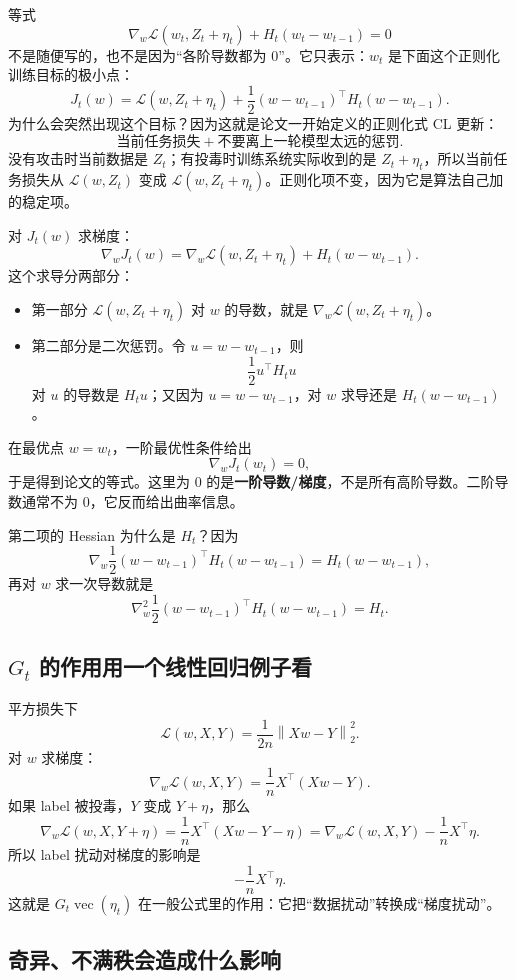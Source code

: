 \documentclass[UTF8,fontset=none,11pt]{ctexart}
\theoremstyle{cnstyle}
\newcommand{\vect}{\operatorname{vec}}
\newcommand{\calL}{\mathcal{L}}
\newcommand{\norm}[1]{\left\lVert #1\right\rVert}
\begin{document}
等式
\[
  \nabla_w\calL(w_t,Z_t+\eta_t)+H_t(w_t-w_{t-1})=0
\]
不是随便写的，也不是因为“各阶导数都为 0”。它只表示：\(w_t\) 是下面这个正则化训练目标的极小点：
\[
  J_t(w)
  =
  \calL(w,Z_t+\eta_t)
  +\frac12(w-w_{t-1})^\top H_t(w-w_{t-1}).
\]
为什么会突然出现这个目标？因为这就是论文一开始定义的正则化式 CL 更新：
\[
  \text{当前任务损失}+\text{不要离上一轮模型太远的惩罚}.
\]
没有攻击时当前数据是 \(Z_t\)；有投毒时训练系统实际收到的是 \(Z_t+\eta_t\)，所以当前任务损失从 \(\calL(w,Z_t)\) 变成 \(\calL(w,Z_t+\eta_t)\)。正则化项不变，因为它是算法自己加的稳定项。

对 \(J_t(w)\) 求梯度：
\[
  \nabla_wJ_t(w)
  =
  \nabla_w\calL(w,Z_t+\eta_t)
  +
  H_t(w-w_{t-1}).
\]
这个求导分两部分：
\begin{itemize}
  \item 第一部分 \(\calL(w,Z_t+\eta_t)\) 对 \(w\) 的导数，就是 \(\nabla_w\calL(w,Z_t+\eta_t)\)。
  \item 第二部分是二次惩罚。令 \(u=w-w_{t-1}\)，则
  \[
    \frac12u^\top H_tu
  \]
  对 \(u\) 的导数是 \(H_tu\)；又因为 \(u=w-w_{t-1}\)，对 \(w\) 求导还是 \(H_t(w-w_{t-1})\)。
\end{itemize}
在最优点 \(w=w_t\)，一阶最优性条件给出
\[
  \nabla_wJ_t(w_t)=0,
\]
于是得到论文的等式。这里为 0 的是\textbf{一阶导数/梯度}，不是所有高阶导数。二阶导数通常不为 0，它反而给出曲率信息。

第二项的 Hessian 为什么是 \(H_t\)？因为
\[
  \nabla_w\frac12(w-w_{t-1})^\top H_t(w-w_{t-1})
  =
  H_t(w-w_{t-1}),
\]
再对 \(w\) 求一次导数就是
\[
  \nabla_w^2\frac12(w-w_{t-1})^\top H_t(w-w_{t-1})
  =
  H_t.
\]

\subsection{\(G_t\) 的作用用一个线性回归例子看}

平方损失下
\[
  \calL(w,X,Y)=\frac1{2n}\norm{Xw-Y}_2^2.
\]
对 \(w\) 求梯度：
\[
  \nabla_w\calL(w,X,Y)=\frac1nX^\top(Xw-Y).
\]
如果 label 被投毒，\(Y\) 变成 \(Y+\eta\)，那么
\[
  \nabla_w\calL(w,X,Y+\eta)
  =
  \frac1nX^\top(Xw-Y-\eta)
  =
  \nabla_w\calL(w,X,Y)-\frac1nX^\top\eta.
\]
所以 label 扰动对梯度的影响是
\[
  -\frac1nX^\top\eta.
\]
这就是 \(G_t\vect(\eta_t)\) 在一般公式里的作用：它把“数据扰动”转换成“梯度扰动”。

\subsection{奇异、不满秩会造成什么影响}
\end{document}
